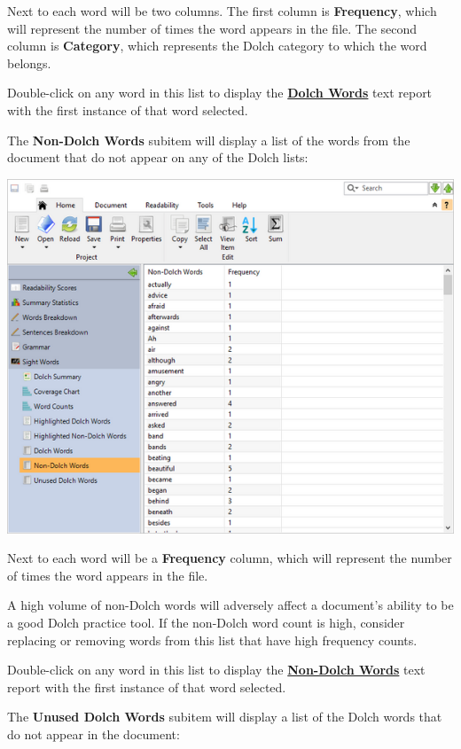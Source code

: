 \documentclass[
]{book}
\theoremstyle{definition}
\theoremstyle{definition}
\theoremstyle{definition}
\theoremstyle{definition}
\theoremstyle{remark}
\begin{document}
Next to each word will be two columns. The first column is \textbf{Frequency}, which will represent the number of times the word appears in the file. The second column is \textbf{Category}, which represents the Dolch category to which the word belongs.

Double-click on any word in this list to display the \protect\hyperlink{reviewing-dolch-text}{\textbf{Dolch Words}} text report with the first instance of that word selected.

The \textbf{Non-Dolch Words} subitem will display a list of the words from the document that do not appear on any of the Dolch lists:

\includegraphics{Images/dolchnonwordslist.png}

Next to each word will be a \textbf{Frequency} column, which will represent the number of times the word appears in the file.

A high volume of non-Dolch words will adversely affect a document's ability to be a good Dolch practice tool. If the non-Dolch word count is high, consider replacing or removing words from this list that have high frequency counts.

Double-click on any word in this list to display the \protect\hyperlink{reviewing-dolch-text}{\textbf{Non-Dolch Words}} text report with the first instance of that word selected.

The \textbf{Unused Dolch Words} subitem will display a list of the Dolch words that do not appear in the document:
\end{document}
